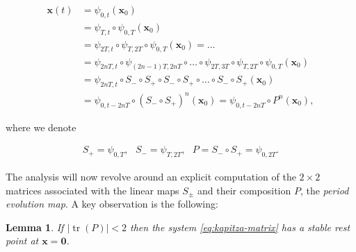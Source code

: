 \documentclass[11pt]{report}
\theoremstyle{plain}
\newtheorem{lem}[thm]{Lemma}
\theoremstyle{definition}
\begin{document}
\begin{equation*} \tag{41}\label{eq:kapitza-phase-flow}
\begin{split}
\mathbf{x}(t) &= \psi_{0,t}(\mathbf{x}_0) \\
&=
\psi_{T,t} \circ \psi_{0,T}(\mathbf{x}_0) \\
&=
\psi_{2T,t} \circ \psi_{T,2T}\circ \psi_{0,T}(\mathbf{x}_0) =  \ldots \\
&=
\psi_{2nT, t} \circ \psi_{(2n-1)T,2nT} \circ \ldots
\circ \psi_{2T,3T} \circ \psi_{T,2T}\circ \psi_{0,T}(\mathbf{x}_0) \\
&=
\psi_{2nT, t} \circ S_- \circ S_+ \circ S_- \circ S_+ \circ \ldots \circ S_- \circ S_+ (\mathbf{x}_0) \\
&=
\psi_{0, t-2nT} \circ (S_- \circ S_+)^n (\mathbf{x}_0) = \psi_{0, t-2nT} \circ P^n (\mathbf{x}_0),
\end{split}
\end{equation*}

\noindent where we denote

\begin{align*}
S_+ = \psi_{0,T}, \ \ \ S_- = \psi_{T,2T}, \ \ \ P= S_- \circ S_+ = \psi_{0,2T}.
\end{align*}

\noindent The analysis will now revolve around an explicit
computation of the $2\times 2$ matrices associated
with the linear maps $S_\pm$ and their composition
$P$, the \emph{period evolution map}. A key observation is
the following:

\begin{lem}
If $|\operatorname{tr}(P)|<2$ then the system
\eqref{eq:kapitza-matrix} has a stable rest point at
$\mathbf{x}=\mathbf{0}$.
\end{lem}
\end{document}
